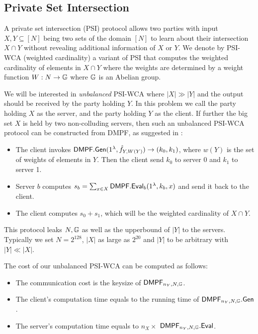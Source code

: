 \subsection{Private Set Intersection}\label{sec:PSI_prelim}
A private set intersection (PSI) protocol \cite{freedman_efficient_2004} allows two parties with input $X,Y\subseteq [N]$ being two sets of the domain $[N]$ to learn about their intersection $X\cap Y$ without revealing additional information of $X$ or $Y$. We denote by PSI-WCA (weighted cardinality) a variant of PSI that computes the weighted cardinality of elements in $X\cap Y$ where the weights are determined by a weight function $W:N\rightarrow \mathbb{G}$ where $\mathbb{G}$ is an Abelian group. 

We will be interested in \emph{unbalanced} PSI-WCA where $|X|\gg |Y|$ and the output should be received by the party holding $Y$. In this problem we call the party holding $X$ as the server, and the party holding $Y$ as the client. If further the big set $X$ is held by two non-colluding servers, then such an unbalanced PSI-WCA protocol can be constructed from DMPF, as suggested in \cite{cryptoeprint:2020/1599}: 
\begin{itemize}
  \item The client invokes ${\sf DMPF}.{\sf Gen}(1^\lambda, \hat{f}_{Y,W(Y)})\rightarrow (k_0,k_1)$, where $w(Y)$ is the set of weights of elements in $Y$. Then the client send $k_0$ to server 0 and $k_1$ to server 1. 
  \item Server $b$ computes $s_b=\sum_{x\in X}{\sf DMPF}.{\sf Eval}_b(1^\lambda, k_b,x)$ and send it back to the client. 
  \item The client computes $s_0+s_1$, which will be the weighted cardinality of $X\cap Y$. 
\end{itemize}

This protocol leaks $N,\mathbb{G}$ as well as the upperbound of $|Y|$ to the servers. Typically we set $N = 2^{128}$, $|X|$ as large as $2^{20}$ and $|Y|$ to be arbitrary with $|Y|\ll |X|$. 

The cost of our unbalanced PSI-WCA can be computed as follows: 
\begin{itemize}
  \item The communication cost is the keysize of ${\sf DMPF}_{n_Y,N,\mathbb{G}}$. 
  \item The client's computation time equals to the running time of ${\sf DMPF}_{n_Y,N,\mathbb{G}}.{\sf Gen}$. 
  \item The server's computation time equals to $n_X\times$ ${\sf DMPF}_{n_Y,N,\mathbb{G}}.{\sf Eval}$. 
\end{itemize}